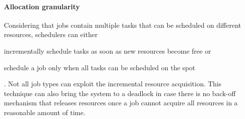 \paragraph{Allocation granularity}
Considering that jobs contain multiple tasks that can be scheduled on different resources, schedulers can either
\begin{mylist}
    \item incrementally schedule tasks as soon as new resources become free or
    \item schedule a job only when all tasks can be scheduled on the spot
\end{mylist}.
Not all job types can exploit the incremental resource acquisition.
This technique can also bring the system to a deadlock in case there is no back-off mechanism that releases resources once a job cannot acquire all resources in a reasonable amount of time.